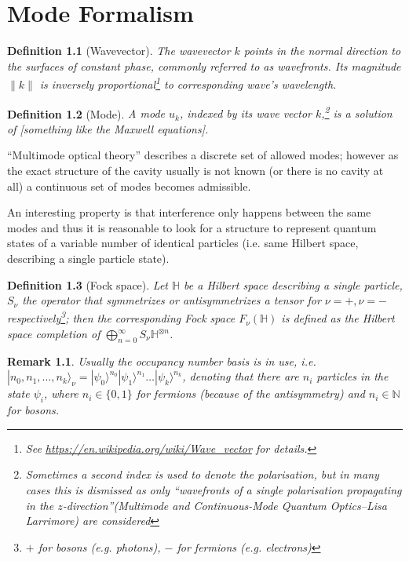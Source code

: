 \documentclass[11pt]{report}
\newtheorem{definition}{Definition}[chapter]
\newtheorem*{remark}{Remark}
\begin{document}
\chapter{Mode Formalism}
\begin{definition}[Wavevector]
	The wavevector $k$ points in the normal direction to the surfaces of constant phase, commonly referred to as wavefronts. Its magnitude $\|k\|$ is inversely proportional\footnote{See \url{https://en.wikipedia.org/wiki/Wave_vector} for details.} to corresponding wave's wavelength.
\end{definition}

\begin{definition}[Mode]
	A mode $u_k$, indexed by its wave vector $k$,\footnote{Sometimes a second index is used to denote the polarisation, but in many cases this is dismissed as only ``wavefronts of a single polarisation propagating in the $z$-direction''(Multimode and Continuous-Mode Quantum Optics--Lisa Larrimore) are considered} is a solution of [something like the Maxwell equations].
\end{definition}

``Multimode optical theory'' describes a discrete set of allowed modes; however as the exact structure of the cavity usually is not known (or there is no cavity at all) a continuous set of modes becomes admissible.

An interesting property is that interference only happens between the same modes  and thus it is reasonable to look for a structure to represent quantum states of a variable number of identical particles (i.e. same Hilbert space, describing a single particle state).

\begin{definition}[Fock space]
	Let $\mathbb H$ be a Hilbert space describing a single particle, $S_\nu$ the operator that symmetrizes or antisymmetrizes a tensor for $\nu = +, \nu = -$ respectively\footnote{$+$ for bosons (e.g. photons), $-$ for fermions (e.g. electrons)}; then the corresponding Fock space $F_\nu(\mathbb H)$ is defined as the Hilbert space completion of $\bigoplus_{n=0}^{\infty}S_\nu \mathbb H^{\otimes n}$.
\end{definition}
\begin{remark}
	Usually the occupancy number basis is in use, i.e. $|n_0,n_1,\dots,n_k\rangle_\nu = |\psi_0\rangle^{n_0}|\psi_1\rangle^{n_1}\dots|\psi_k\rangle^{n_k}$, denoting that there are $n_i$ particles in the state $\psi_i$, where $n_i\in\{0,1\}$ for fermions (because of the antisymmetry) and $n_i\in\mathbb N$ for bosons.
\end{remark}
\end{document}
